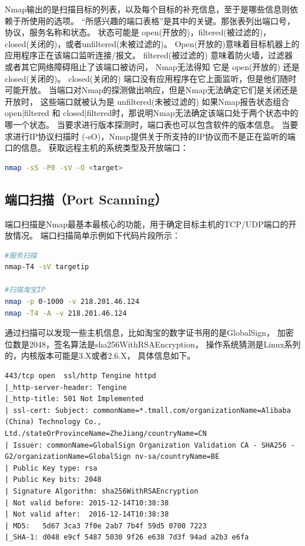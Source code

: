 \documentclass{book}
\begin{document}
Nmap输出的是扫描目标的列表，以及每个目标的补充信息，至于是哪些信息则依赖于所使用的选项。
“所感兴趣的端口表格”是其中的关键。那张表列出端口号，协议，服务名称和状态。
状态可能是 open(开放的)，filtered(被过滤的)， closed(关闭的)，或者unfiltered(未被过滤的)。
Open(开放的)意味着目标机器上的应用程序正在该端口监听连接/报文。 
filtered(被过滤的) 意味着防火墙，过滤器或者其它网络障碍阻止了该端口被访问，
Nmap无法得知 它是 open(开放的) 还是 closed(关闭的)。 
closed(关闭的) 端口没有应用程序在它上面监听，但是他们随时可能开放。 
当端口对Nmap的探测做出响应，但是Nmap无法确定它们是关闭还是开放时，
这些端口就被认为是 unfiltered(未被过滤的) 如果Nmap报告状态组合 
open|filtered 和 closed|filtered时，那说明Nmap无法确定该端口处于两个状态中的哪一个状态。
当要求进行版本探测时，端口表也可以包含软件的版本信息。
当要求进行IP协议扫描时 (-sO)，Nmap提供关于所支持的IP协议而不是正在监听的端口的信息。
获取远程主机的系统类型及开放端口：

\begin{lstlisting}[language=Bash]
nmap -sS -P0 -sV -O <target>
\end{lstlisting}

\subsection{端口扫描（Port Scanning）}

端口扫描是Nmap最基本最核心的功能，用于确定目标主机的TCP/UDP端口的开放情况。
端口扫描简单示例如下代码片段所示：

\begin{lstlisting}[language=Bash]
#服务扫描
nmap-T4 -sV targetip 

#扫描淘宝IP
nmap -p 0-1000 -v 218.201.46.124
nmap -T4 -A -v 218.201.46.124
\end{lstlisting}

通过扫描可以发现一些主机信息，比如淘宝的数字证书用的是GlobalSign，
加密位数是2048，签名算法是sha256WithRSAEncryption，
操作系统猜测是Linux系列的，内核版本可能是3.X或者2.6.X，
具体信息如下。

\begin{lstlisting}
443/tcp open  ssl/http Tengine httpd
|_http-server-header: Tengine
|_http-title: 501 Not Implemented
| ssl-cert: Subject: commonName=*.tmall.com/organizationName=Alibaba (China) Technology Co., Ltd./stateOrProvinceName=ZheJiang/countryName=CN
| Issuer: commonName=GlobalSign Organization Validation CA - SHA256 - G2/organizationName=GlobalSign nv-sa/countryName=BE
| Public Key type: rsa
| Public Key bits: 2048
| Signature Algorithm: sha256WithRSAEncryption
| Not valid before: 2015-12-14T10:38:38
| Not valid after:  2016-12-14T10:38:38
| MD5:   5d67 3ca3 7f0e 2ab7 7b4f 59d5 0700 7223
|_SHA-1: d048 e9cf 5487 5030 9f26 e638 7d3f 94ad a2b3 e6fa
\end{lstlisting}
\end{document}
